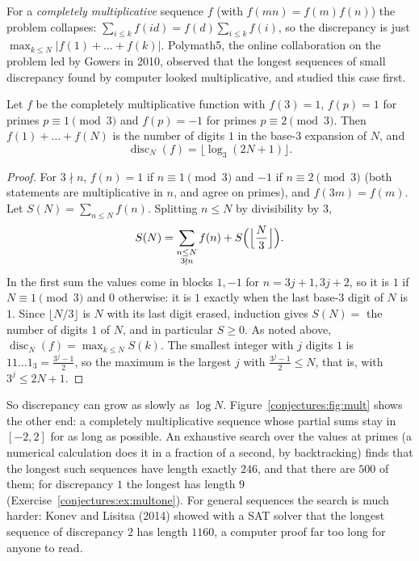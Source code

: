 For a \emph{completely multiplicative} sequence $f$ (with $f(mn)=f(m)f(n)$) the problem collapses: $\sum_{i\le k}f(id)=f(d)\sum_{i\le k}f(i)$, so the
discrepancy is just $\max_{k\le N}|f(1)+\dots+f(k)|$. Polymath5, the online collaboration on the problem led by Gowers in 2010, observed that the longest
sequences of small discrepancy found by computer looked multiplicative, and studied this case first.

\begin{proposition}\label{conjectures:prop:bcc}
Let $f$ be the completely multiplicative function with $f(3)=1$, $f(p)=1$ for primes $p\equiv1\pmod3$ and $f(p)=-1$ for primes $p\equiv2\pmod3$. Then
$f(1)+\dots+f(N)$ is the number of digits $1$ in the base-$3$ expansion of $N$, and
\[
\operatorname{disc}_N(f)=\bigl\lfloor\log_3(2N+1)\bigr\rfloor.
\]
\end{proposition}
\begin{proof}
For $3\nmid n$, $f(n)=1$ if $n\equiv1\pmod3$ and $-1$ if $n\equiv2\pmod3$ (both statements are multiplicative in $n$, and agree on primes), and
$f(3m)=f(m)$. Let $S(N)=\sum_{n\le N}f(n)$. Splitting $n\le N$ by divisibility by $3$,
\[
S(N)=\sum_{\substack{n\le N\\3\nmid n}}f(n)+S\Bigl(\Bigl\lfloor\frac N3\Bigr\rfloor\Bigr).
\]
In the first sum the values come in blocks $1,-1$ for $n=3j+1,3j+2$, so it is $1$ if $N\equiv1\pmod3$ and $0$ otherwise: it is $1$ exactly when the last
base-$3$ digit of $N$ is $1$. Since $\lfloor N/3\rfloor$ is $N$ with its last digit erased, induction gives $S(N)=$ the number of digits $1$ of $N$, and in
particular $S\ge0$. As noted above, $\operatorname{disc}_N(f)=\max_{k\le N}S(k)$. The smallest integer with $j$ digits $1$ is $11\dots1_3=\frac{3^j-1}2$, so the
maximum is the largest $j$ with $\frac{3^j-1}2\le N$, that is, with $3^j\le2N+1$.
\end{proof}

So discrepancy can grow as slowly as $\log N$. Figure~\ref{conjectures:fig:mult} shows the other end: a completely multiplicative sequence whose partial sums stay in
$[-2,2]$ for as long as possible. An exhaustive search over the values at primes (a numerical calculation does it in a fraction of a second, by backtracking) finds that
the longest such sequences have length exactly $246$, and that there are $500$ of them; for discrepancy $1$ the longest has length $9$
(Exercise~\ref{conjectures:ex:multone}). For general sequences the search is much harder: Konev and Lisitsa (2014) showed with a SAT solver that the longest sequence of
discrepancy $2$ has length $1160$, a computer proof far too long for anyone to read.

